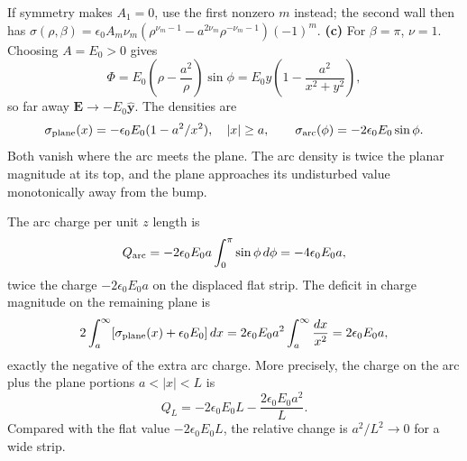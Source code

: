 If symmetry makes $A_1=0$, use the first nonzero $m$ instead;
the second wall then has
$\sigma(\rho,\beta)=\epsilon _0A_m\nu_m
(\rho^{\nu_m-1}-a^{2\nu_m}\rho^{-\nu_m-1})(-1)^m$.
\textbf{(c)} For $\beta=\pi$, $\nu=1$. Choosing $A=E_0>0$ gives
\[
\Phi=E_0\left(\rho-\frac{a^2}\rho\right)\sin\phi
=E_0y\left(1-\frac{a^2}{x^2+y^2}\right),
\]
so far away $\mathbf E\to-E_0\widehat{\mathbf y}$. The densities are
\[
\sigma_{\rm plane}(x)=-\epsilon _0E_0(1-a^2/x^2),\quad |x|\geq a,
\qquad\sigma_{\rm arc}(\phi)=-2\epsilon _0E_0\sin\phi.
\]
Both vanish where the arc meets the plane. The arc density is twice
the planar magnitude at its top, and the plane approaches its
undisturbed value monotonically away from the bump.
\begin{center}
\end{center}
The arc charge per unit $z$ length is
\[
Q_{\rm arc}=-2\epsilon _0E_0a\int_0^\pi\sin\phi\,d\phi
=-4\epsilon _0E_0a,
\]
twice the charge $-2\epsilon _0E_0a$ on the displaced flat strip.
The deficit in charge magnitude on the remaining plane is
\[
2\int_a^\infty[\sigma_{\rm plane}(x)+\epsilon _0E_0]\,dx
=2\epsilon _0E_0a^2\int_a^\infty\frac{dx}{x^2}
=2\epsilon _0E_0a,
\]
exactly the negative of the extra arc charge. More precisely, the
charge on the arc plus the plane portions $a<|x|<L$ is
\[
Q_L=-2\epsilon _0E_0L-\frac{2\epsilon _0E_0a^2}{L}.
\]
Compared with the flat value $-2\epsilon _0E_0L$, the relative
change is $a^2/L^2\to0$ for a wide strip.

